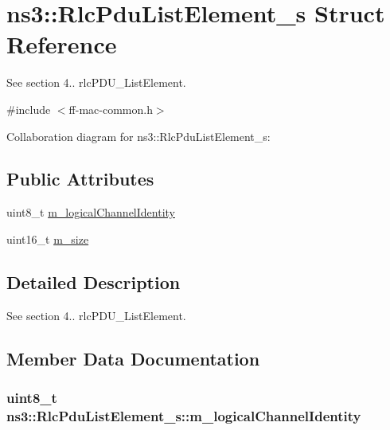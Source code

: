\hypertarget{structns3_1_1RlcPduListElement__s}{}\section{ns3\+:\+:Rlc\+Pdu\+List\+Element\+\_\+s Struct Reference}
\label{structns3_1_1RlcPduListElement__s}


See section 4.. rlc\+P\+D\+U\+\_\+\+List\+Element.  




{\ttfamily \#include $<$ff-\/mac-\/common.\+h$>$}



Collaboration diagram for ns3\+:\+:Rlc\+Pdu\+List\+Element\+\_\+s\+:
\subsection*{Public Attributes}
\begin{DoxyCompactItemize}
\item 
uint8\+\_\+t \hyperlink{structns3_1_1RlcPduListElement__s_ad744f2724367c252057989d886ff5c00}{m\+\_\+logical\+Channel\+Identity}
\item 
uint16\+\_\+t \hyperlink{structns3_1_1RlcPduListElement__s_a29a281dbeb666f293de9a94609bb4383}{m\+\_\+size}
\end{DoxyCompactItemize}


\subsection{Detailed Description}
See section 4.. rlc\+P\+D\+U\+\_\+\+List\+Element. 

\subsection{Member Data Documentation}
\subsubsection[{\texorpdfstring{m\+\_\+logical\+Channel\+Identity}{m_logicalChannelIdentity}}]{\setlength{\rightskip}{0pt plus 5cm}uint8\+\_\+t ns3\+::\+Rlc\+Pdu\+List\+Element\+\_\+s\+::m\+\_\+logical\+Channel\+Identity}\hypertarget{structns3_1_1RlcPduListElement__s_ad744f2724367c252057989d886ff5c00}{}\label{structns3_1_1RlcPduListElement__s_ad744f2724367c252057989d886ff5c00}
